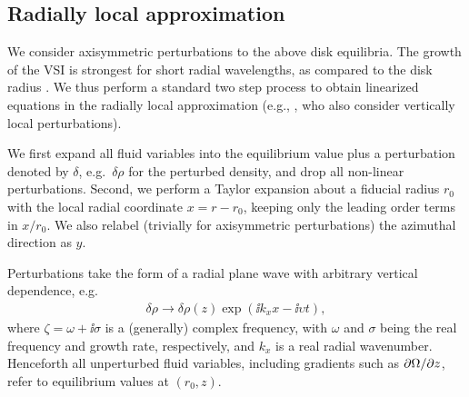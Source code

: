 \subsection{Radially local approximation}\label{sec:radlocal}
We consider axisymmetric perturbations to the above disk equilibria.    
The growth of the VSI is strongest for short radial wavelengths, as compared
 to the disk radius .  We thus perform a
 standard two step process to obtain linearized equations in the radially local 
 approximation (e.g., \citealp{goldreich67}, who also consider vertically local perturbations).  
 
 We first expand all fluid variables 
 into the equilibrium value plus a perturbation denoted by $\delta$, e.g.\ 
 $\delta \rho$ for the perturbed density, and drop all non-linear perturbations.  Second, we perform
 a Taylor expansion about a fiducial radius $r_0$ with the local radial coordinate
 $x = r - r_0$, keeping only the leading order terms in $x/r_0$.  We also relabel 
 (trivially for axisymmetric perturbations) the azimuthal direction as $y$.  
 
 Perturbations take the form of a radial plane wave with arbitrary vertical dependence, 
 e.g.\
 \begin{align}
  \delta\rho \rightarrow \delta\rho(z)\exp{\left(\ii k_x x - \ii\upsilon
      t\right)},    
\end{align}
where $\zeta = \omega + \ii \sigma$ is a (generally) complex frequency, 
with $\omega$ and $\sigma$ being
the real frequency and growth rate, respectively, and $k_x$ is a real 
radial wavenumber.  Henceforth all unperturbed fluid variables, including 
gradients such as $\partial \Omega/ \partial z$, refer to  equilibrium values at $(r_0, z)$.

